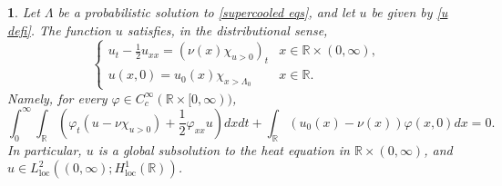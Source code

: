 \documentclass{article}
\numberwithin{equation}{section}
\numberwithin{figure}{section}
\theoremstyle{plain}
\theoremstyle{plain}
\newtheorem{prop}[thm]{\protect\propositionname}
\theoremstyle{plain}
\theoremstyle{plain}
\theoremstyle{definition}
\theoremstyle{remark}
\def\R{{\mathbb{R}}}
\providecommand{\propositionname}{Proposition}
\begin{document}
\begin{prop} \label{prop: u eq} Let $\Lambda$ be a probabilistic solution to \eqref{supercooled eqs}, and let $u$ be given by \eqref{u defi}. The function $u$ satisfies, in the distributional sense,
    \begin{equation}\label{u equation}\begin{cases} u_t-\frac12 u_{xx}=(\nu(x)\chi_{u>0})_t & x\in \R \times (0,\infty), \\
    u(x,0)=u_0(x) \chi_{x>\Lambda_0} &x\in \R.
    \end{cases}
\end{equation}
Namely, for every $\varphi\in C_c^{\infty}(\R \times [0,\infty))$,
\begin{equation}\label{u equation dist}
     \int_{0}^{\infty}\int_{\R} \left( \varphi_t(u-\nu \chi_{u>0})+\frac{1}{2}\varphi_{xx}u\right)dxdt+\int_{\R}(u_0(x)-\nu(x))\varphi(x,0)dx=0.
\end{equation}
In particular, $u$ is a global subsolution to the heat equation in $\R \times (0,\infty)$, and $u \in L^2_{\operatorname{loc}}((0,\infty);H^1_{\operatorname{loc}}(\R))$.
\end{prop}
\end{document}
